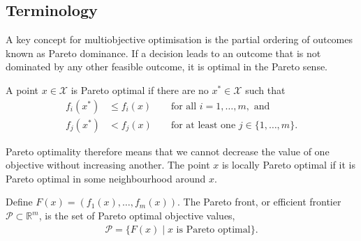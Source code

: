 \documentclass[main.tex]{subfiles}
\begin{document}
\subsection{Terminology}\label{sec:multi_terminology}
A key concept for multiobjective optimisation is the partial
ordering of outcomes known as Pareto dominance. If a decision leads to
an outcome that is not dominated by any other feasible outcome, it is
optimal in the Pareto sense.
\begin{mydef}
  A point $x\in\mathcal{X}$ is Pareto optimal if there are no
  $x^*\in\mathcal{X}$ such that
  \begin{align}
    f_i(x^*)&\leq f_i(x) &&\text{ for all } i = 1,\dots,m, \text{ and}\\
    f_j(x^*)&<f_j(x) &&\text{ for at least one } j \in \{1,\dots,m\}.
  \end{align}
\end{mydef}
Pareto optimality therefore means that we cannot decrease the value of
one objective without increasing another.
The point $x$ is locally Pareto optimal if it is Pareto optimal in
some neighbourhood around $x$.
\begin{mydef}
  Define $F(x) = (f_1(x),\dots,f_m(x))$.
  The Pareto front, or efficient frontier $\mathcal{P}\subset
  \mathbb{R}^m$, is the set of
  Pareto optimal objective values,
  \begin{align}
    \mathcal{P} = \{F(x) \mid x \text{ is Pareto optimal}\}.
  \end{align}
\end{mydef}
\end{document}
